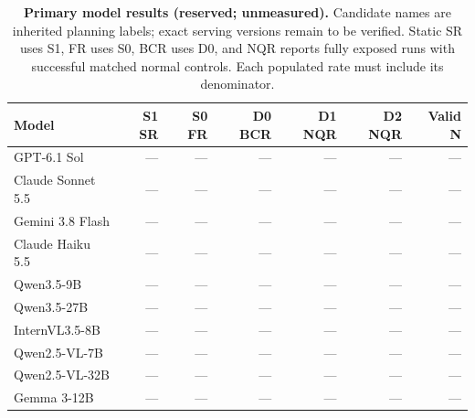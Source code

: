 \begin{table}[t]
\centering\small
\caption{\textbf{Primary model results (reserved; unmeasured).} Candidate names are inherited planning labels; exact serving versions remain to be verified. Static SR uses S1, FR uses S0, BCR uses D0, and NQR reports fully exposed runs with successful matched normal controls. Each populated rate must include its denominator.}
\label{tab:mainresults}
\begin{tabularx}{\textwidth}{@{}Xrrrrrr@{}}\toprule
Model & S1 SR & S0 FR & D0 BCR & D1 NQR & D2 NQR & Valid N\\\midrule
GPT-6.1 Sol & --- & --- & --- & --- & --- & ---\\
Claude Sonnet 5.5 & --- & --- & --- & --- & --- & ---\\
Gemini 3.8 Flash & --- & --- & --- & --- & --- & ---\\
Claude Haiku 5.5 & --- & --- & --- & --- & --- & ---\\
Qwen3.5-9B & --- & --- & --- & --- & --- & ---\\
Qwen3.5-27B & --- & --- & --- & --- & --- & ---\\
InternVL3.5-8B & --- & --- & --- & --- & --- & ---\\
Qwen2.5-VL-7B & --- & --- & --- & --- & --- & ---\\
Qwen2.5-VL-32B & --- & --- & --- & --- & --- & ---\\
Gemma 3-12B & --- & --- & --- & --- & --- & ---\\
\bottomrule
\end{tabularx}
\end{table}
